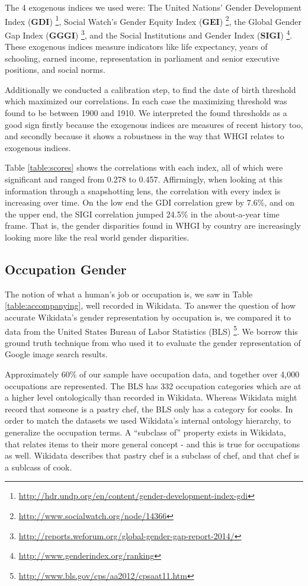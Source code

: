\documentclass[letterpaper]{article}
\begin{document}
The 4 exogenous indices we used were: The United Nations' Gender Development Index (\textbf{GDI})  \footnote{\url{http://hdr.undp.org/en/content/gender-development-index-gdi}},  Social Watch's Gender Equity Index (\textbf{GEI}) \footnote{\url{http://www.socialwatch.org/node/14366}},  the Global Gender Gap Index (\textbf{GGGI}) \footnote{\url{http://reports.weforum.org/global-gender-gap-report-2014/}}, and the Social Institutions and Gender Index (\textbf{SIGI}) \footnote{\url{http://www.genderindex.org/ranking}}. 
These exogenous indices measure indicators like life expectancy, years of schooling, earned income, representation in parliament and senior executive positions, and social norms.

Additionally we conducted a calibration step, to find the date of birth threshold which maximized our correlations. In each case the maximizing threshold was found to be between 1900 and 1910. We interpreted the found thresholds as a good sign firstly because the exogenous indices are measures of recent history too, and secondly because it shows a robustness in the way that WHGI relates to exogenous indices.

Table \ref{table:scores} shows the correlations with each index, all of which were significant and ranged from 0.278 to 0.457. Affirmingly, when looking at this information through a snapshotting lens, the correlation with every index is increasing over time. On the low end the GDI correlation grew by 7.6\%, and on the upper end, the SIGI correlation jumped 24.5\% in the about-a-year time frame. That is, the gender disparities found in WHGI by country are increasingly looking more like the real world gender disparities.


\subsection{Occupation Gender}
The notion of what a human's job or occupation is, we saw in Table \ref{table:accompanying}, well recorded in Wikidata. To answer the question of how accurate Wikidata's gender representation by occupation is, we compared it to data from the United States Bureau of Labor Statistics (BLS) \footnote{\url{http://www.bls.gov/cps/aa2012/cpsaat11.htm}}. We borrow this ground truth technique from \cite{kay_unequal_2015} who used it to evaluate the gender representation of Google image search results.

Approximately 60\% of our sample have occupation data, and together over 4,000 occupations are represented. The BLS has 332 occupation categories which are at a higher level ontologically than  recorded in Wikidata. Whereas Wikidata might record that someone is a pastry chef, the BLS only has a category for cooks. In order to match the datasets we used Wikidata's internal ontology hierarchy, to generalize the occupation terms. A ``subclass of'' property exists in Wikidata, that relates items to their more general concept - and this is true for occupations as well. Wikidata describes that pastry chef is a subclass of chef, and that chef is a sublcass of cook. 
\end{document}
